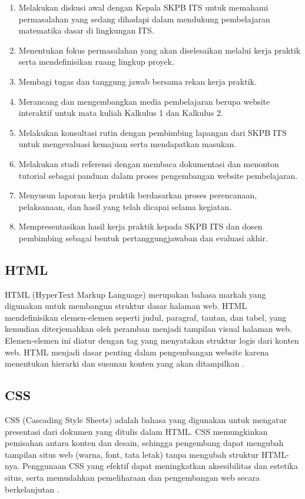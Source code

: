 \documentclass{file/KP-ITS}
\theoremstyle{definition}
\theoremstyle{definition}
\theoremstyle{plain}
\begin{document}
\begin{enumerate}
  \item Melakukan diskusi awal dengan Kepala SKPB ITS untuk memahami permasalahan yang sedang dihadapi dalam mendukung pembelajaran matematika dasar di lingkungan ITS.
  \item Menentukan fokus permasalahan yang akan diselesaikan melalui kerja praktik serta mendefinisikan ruang lingkup proyek.
  \item Membagi tugas dan tanggung jawab bersama rekan kerja praktik.
  \item Merancang dan mengembangkan media pembelajaran berupa website interaktif untuk mata kuliah Kalkulus 1 dan Kalkulus 2.
  \item Melakukan konsultasi rutin dengan pembimbing lapangan dari SKPB ITS untuk mengevaluasi kemajuan serta mendapatkan masukan.
  \item Melakukan studi referensi dengan membaca dokumentasi dan menonton tutorial sebagai panduan dalam proses pengembangan website pembelajaran.
  \item Menyusun laporan kerja praktik berdasarkan proses perencanaan, pelaksanaan, dan hasil yang telah dicapai selama kegiatan.
  \item Mempresentasikan hasil kerja praktik kepada SKPB ITS dan dosen pembimbing sebagai bentuk pertanggungjawaban dan evaluasi akhir.
\end{enumerate}

\subsection{HTML}

HTML (HyperText Markup Language) merupakan bahasa markah yang digunakan untuk membangun struktur dasar halaman web. HTML mendefinisikan elemen-elemen seperti judul, paragraf, tautan, dan tabel, yang kemudian diterjemahkan oleh peramban menjadi tampilan visual halaman web. Elemen-elemen ini diatur dengan tag yang menyatakan struktur logis dari konten web. HTML menjadi dasar penting dalam pengembangan website karena menentukan hierarki dan susunan konten yang akan ditampilkan \cite{sharma2024}.

\subsection{CSS}

CSS (Cascading Style Sheets) adalah bahasa yang digunakan untuk mengatur presentasi dari dokumen yang ditulis dalam HTML. CSS memungkinkan pemisahan antara konten dan desain, sehingga pengembang dapat mengubah tampilan situs web (warna, font, tata letak) tanpa mengubah struktur HTML-nya. Penggunaan CSS yang efektif dapat meningkatkan aksesibilitas dan estetika situs, serta memudahkan pemeliharaan dan pengembangan web secara berkelanjutan \cite{hasan2022}.
\end{document}
